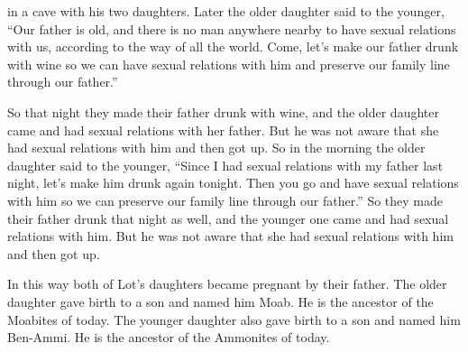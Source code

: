 {in a cave
with his two
daughters.
Later the older daughter
said
to
the younger,
“Our father
is old,
and there is no
man
anywhere nearby
to have sexual relations
with us, according to
the way
of all
the world.
Come, let’s
make our father
drunk
with wine
so we can have sexual
relations with
him and preserve
our family
line through our father.”
\par }{\PP {}So
that night
they made
their father
drunk
with wine,
and the older daughter
came
and had sexual
relations with
her father.
But he was not
aware
that she had sexual
relations with him and then got up.
So in the morning
the older daughter
said
to
the younger,
“Since I
had sexual
relations with
my father
last night,
let’s make him drunk
again tonight.
Then you go
and have sexual
relations with
him so we can preserve
our family line
through our father.”
So they made
their father
drunk
that night
as well,
and
the younger
one came and had sexual
relations with
him. But he was not
aware
that she had sexual
relations with him and then got up.
\par }{\PP {}In this way both
of Lot’s
daughters
became pregnant
by their father.
The older daughter
gave birth
to a son
and named
him Moab.
He is
the ancestor
of the Moabites
of today.
The younger
daughter also
gave birth
to a son
and named
him Ben-Ammi.
He is
the ancestor
of the Ammonites
of today.

}
